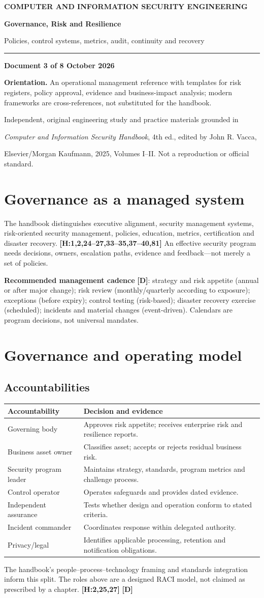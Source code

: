 \documentclass[10pt,letterpaper,oneside]{article}
\newcommand{\handbookref}[1]{\textsf{\color{accent}\textbf{[H:#1]}}}
\newcommand{\designed}{\textsf{\color{accent}\textbf{[D]}}}
\newcommand{\makereportcover}[4]{%
\hypersetup{pageanchor=false}%

\thispagestyle{empty}\vspace*{1.15in}
{\small\bfseries\color{accent} COMPUTER AND INFORMATION SECURITY ENGINEERING}\par\vspace{13pt}
{\Huge\bfseries\color{ink} #1\par}\vspace{15pt}
{\Large\color{muted} #2\par}\vspace{18pt}
\color{accent}\rule{0.94\textwidth}{2.1pt}\par\vspace{20pt}
{\normalsize\bfseries Document #3 of 8 \quad\textbullet\quad 16 October 2026\par}
\vspace{0.35in}
\begin{sourcebox}\textbf{Orientation.} #4\end{sourcebox}
\vfill
{\small\color{muted} Independent, original engineering study and practice materials grounded in\par
\emph{Computer and Information Security Handbook}, 4th ed., edited by John R. Vacca,\par
Elsevier/Morgan Kaufmann, 2025, Volumes I--II. Not a reproduction or official standard.}
\newpage\hypersetup{pageanchor=true}\setcounter{page}{1}\tableofcontents\newpage
}
\begin{document}
\makereportcover{Governance, Risk and Resilience}{Policies, control systems, metrics, audit, continuity and recovery}{3}{An operational management reference with templates for risk registers, policy approval, evidence and business-impact analysis; modern frameworks are cross-references, not substituted for the handbook.}

\section{Governance as a managed system}
The handbook distinguishes executive alignment, security management systems, risk-oriented security management, policies, education, metrics, certification and disaster recovery. \handbookref{1,2,24--27,33--35,37--40,81} An effective security program needs decisions, owners, escalation paths, evidence and feedback---not merely a set of policies.
\begin{sourcebox}\textbf{Recommended management cadence} \designed{}: strategy and risk appetite (annual or after major change); risk review (monthly/quarterly according to exposure); exceptions (before expiry); control testing (risk-based); disaster recovery exercise (scheduled); incidents and material changes (event-driven). Calendars are program decisions, not universal mandates.\end{sourcebox}

\section{Governance and operating model}
\subsection{Accountabilities}
\par\medskip\noindent\begin{tabularx}{\textwidth}{@{}p{}X@{}}\toprule
Accountability & Decision and evidence \\ \midrule
Governing body & Approves risk appetite; receives enterprise risk and resilience reports.\\
Business asset owner & Classifies asset; accepts or rejects residual business risk.\\
Security program leader & Maintains strategy, standards, program metrics and challenge process.\\
Control operator & Operates safeguards and provides dated evidence.\\
Independent assurance & Tests whether design and operation conform to stated criteria.\\
Incident commander & Coordinates response within delegated authority.\\
Privacy/legal & Identifies applicable processing, retention and notification obligations.\\
\bottomrule\end{tabularx}\par\medskip
The handbook's people--process--technology framing and standards integration inform this split. The roles above are a designed RACI model, not claimed as prescribed by a chapter. \handbookref{2,25,27} \designed{}
\end{document}
